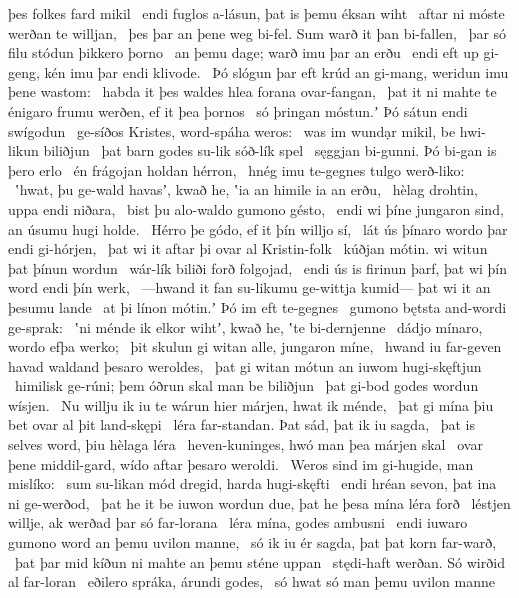 þes folkes fard mikil \hld\ endi fuglos a-lásun,
þat is þemu éksan wiht \hld\ aftar ni móste
werðan te willjan, \hld\ þes þar an þene weg bi-fel.
Sum warð it þan bi-fallen, \hld\ þar só filu stódun
þikkero þorno \hld\ an þemu dage;
warð imu þar an erðu \hld\ endi eft up gi-geng,
kén imu þar endi klivode. \hld\ Þó slógun þar eft krúd an gi-mang,
weridun imu þene wastom: \hld\ habda it þes waldes hlea
forana ovar-fangan, \hld\ þat it ni mahte te énigaro frumu werðen,
ef it þea þornos \hld\ só þringan móstun.ʼ
Þó sátun endi swígodun \hld\ ge-síðos Kristes,
word-spáha weros: \hld\ was im wundạr mikil,
be hwi-likun biliðjun \hld\ þat barn godes
su-lik sóð-lík spel \hld\ sęggjan bi-gunni.
Þó bi-gan is þero erlo \hld\ én frágojan
holdan hérron, \hld\ hnég imu te-gegnes
tulgo werð-liko: \hld\ ʽhwat, þu ge-wald havasʼ, kwað he,
ʽia an himile ia an erðu, \hld\ hèlag drohtin,
uppa endi niðara, \hld\ bist þu alo-waldo
gumono gésto, \hld\ endi wi þíne jungaron sind,
an úsumu hugi holde. \hld\ Hérro þe gódo,
ef it þín willjo sí, \hld\ lát ús þínaro wordo þar
endi gi-hórjen, \hld\ þat wi it aftar þi
ovar al Kristin-folk \hld\ kúðjan mótin.
wi witun þat þínun wordun \hld\ wár-lík biliði
forð folgojad, \hld\ endi ús is firinun þarf,
þat wi þín word endi þín werk, \hld\ —hwand it fan su-likumu ge-wittja kumid—
þat wi it an þesumu lande \hld\ at þi línon mótin.ʼ
Þó im eft te-gegnes \hld\ gumono bętsta
and-wordi ge-sprak: \hld\ ʽni ménde ik elkor wihtʼ, kwað he,
ʽte bi-dernjenne \hld\ dádjo mínaro,
wordo efþa werko; \hld\ þit skulun gi witan alle,
jungaron míne, \hld\ hwand iu far-geven havad
waldand þesaro weroldes, \hld\ þat gi witan mótun
an iuwom hugi-skęftjun \hld\ himilisk ge-rúni;
þem óðrun skal man be biliðjun \hld\ þat gi-bod godes
wordun wísjen. \hld\ Nu willju ik iu te wárun hier
márjen, hwat ik ménde, \hld\ þat gi mína þiu bet
ovar al þit land-skępi \hld\ léra far-standan.
Þat sád, þat ik iu sagda, \hld\ þat is selves word,
þiu hèlaga léra \hld\ heven-kuninges,
hwó man þea márjen skal \hld\ ovar þene middil-gard,
wído aftar þesaro weroldi. \hld\ Weros sind im gi-hugide,
man mislíko: \hld\ sum su-likan mód dregid,
harda hugi-skęfti \hld\ endi hréan sevon,
þat ina ni ge-werðod, \hld\ þat he it be iuwon wordun due,
þat he þesa mína léra forð \hld\ léstjen willje,
ak werðad þar só far-lorana \hld\ léra mína,
godes ambusni \hld\ endi iuwaro gumono word
an þemu uvilon manne, \hld\ só ik iu ér sagda,
þat þat korn far-warð, \hld\ þat þar mid kíðun ni mahte
an þemu sténe uppan \hld\ stędi-haft werðan.
Só wirðid al far-loran \hld\ eðilero spráka,
árundi godes, \hld\ só hwat só man þemu uvilon manne
